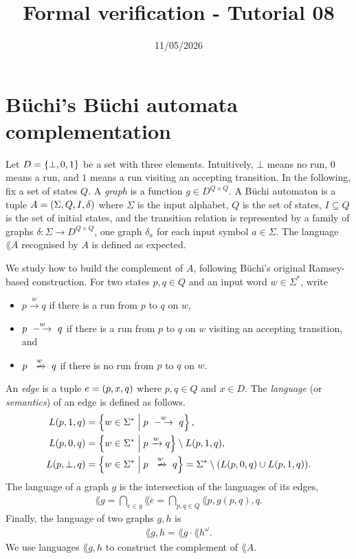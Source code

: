 

\title{Formal verification - Tutorial 08}
\date{11/05/2026}



\maketitle

\section*{Büchi's Büchi automata complementation}

Let $D = \left\{\bot, 0, 1\right\}$ be a set with three elements.
Intuitively, $\bot$ means no run, $0$ means a run,
and $1$ means a run visiting an accepting transition.
%
In the following, fix a set of states $Q$.
%
A \emph{graph} is a function $g \in D^{Q \times Q}$.
%
A Büchi automaton is a tuple $A = \left( \Sigma, Q, I, \delta \right)$ where
$\Sigma$ is the input alphabet,
$Q$ is the set of states, $I \subseteq Q$ is the set of initial states,
and the transition relation is represented by a family of graphs
$\delta : \Sigma \to D^{Q \times Q}$,
one graph $\delta_a$ for each input symbol $a \in \Sigma$.
%
The language $\lang A$ recognised by $A$ is defined as expected.

We study how to build the complement of $A$,
following Büchi's original Ramsey-based construction.
%
For two states $p, q \in Q$ and an input word $w \in \Sigma^*$, write
%
\begin{itemize}
    \item $p \xrightarrow w q$ if there is a run from $p$ to $q$ on $w$,
    \item $p \xdashrightarrow w q$ if there is a run from $p$ to $q$ on $w$ visiting an accepting transition, and
    \item $p \xslashedrightarrow w q$ if there is no run from $p$ to $q$ on $w$.
\end{itemize}
%
An \emph{edge} is a tuple $e = \left( p, x, q \right)$ where $p, q \in Q$ and $x \in D$.
The \emph{language} (or \emph{semantics}) of an edge is defined as follows.
%
\begin{align}
    \lang {p, 1, q}
        &= \setof{w \in \Sigma^*}{p \xdashrightarrow w q}, \\
    \lang {p, 0, q}
        &= \setof{w \in \Sigma^*}{p \xrightarrow w q} \setminus \lang {p, 1, q}, \\
    \lang {p, \bot, q}
        &= \setof{w \in \Sigma^*}{p \xslashedrightarrow w q}
        = \Sigma^* \setminus (\lang {p, 0, q} \cup \lang {p, 1, q}).
\end{align}
%
The language of a graph $g$ is the intersection of the languages of its edges,
%
\begin{align}
    \lang g = \bigcap_{e \in g} \lang e = \bigcap_{p, q \in Q} \lang {p, g(p, q), q}.
\end{align}
%
Finally, the language of two graphs $g, h$ is
%
\begin{align}
    \lang {g, h} = \lang g \cdot \lang h^\omega.
\end{align}
%
We use languages $\lang {g, h}$ to construct the complement of $\lang A$.

